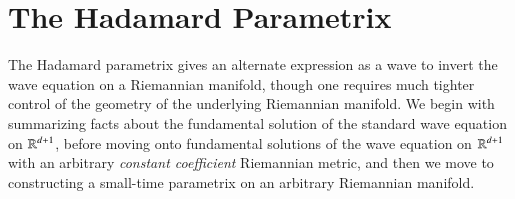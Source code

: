 %
%
%
%
%
%
%







\chapter{The Hadamard Parametrix}

The Hadamard parametrix gives an alternate expression as a wave to invert the wave equation on a Riemannian manifold, though one requires much tighter control of the geometry of the underlying Riemannian manifold. We begin with summarizing facts about the fundamental solution of the standard wave equation on $\operatorname{\mathbb{R}}^{d+1}$, before moving onto fundamental solutions of the wave equation on $\operatorname{\mathbb{R}}^{d+1}$ with an arbitrary \emph{constant coefficient} Riemannian metric, and then we move to constructing a small-time parametrix on an arbitrary Riemannian manifold.

